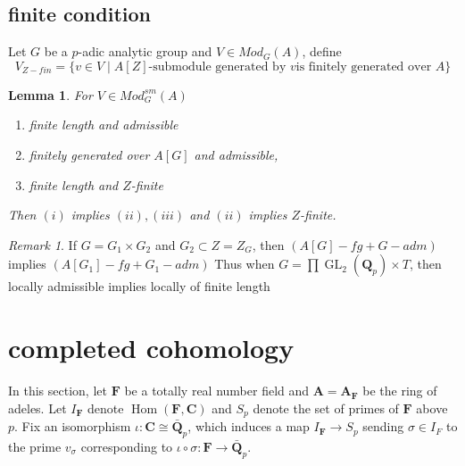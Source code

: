 \documentclass[leqno]{amsart}
\DeclareMathOperator{\GL}{GL}
\newcommand{\Q}{{\mathbf{Q}}}
\newcommand{\Qp}{\mathbf{Q}_p}
\newcommand{\C}{\mathbf C}
\newcommand{\A}{\mathbf A}
\newcommand{\F}{{\mathbf{F}}} %
\newcommand{\1}{\mathbf{1}}
\DeclareMathOperator{\Hom}{Hom}
\newtheorem{lem}[thm]{Lemma}
\theoremstyle{definition}
\theoremstyle{remark}
\newtheorem{rem}[thm]{Remark}
\begin{document}
\subsection{finite condition}

Let $G$ be a  $p$-adic analytic group
and  $V\in Mod_G(A)$, define 
 \[
	V_{Z-fin}=
	\{v\in V\mid \text{$A[Z]$-submodule generated by  $v$
	is finitely generated over  $A$}\}
\]
\begin{lem}
	For $V\in Mod_G^{sm}(A)$
	\begin{enumerate}[label=(\alph*)]
		\item finite length and admissible
		\item finitely generated over $A[G]$
			and admissible, 
		\item finite length and $Z$-finite
	\end{enumerate}
	Then $(i)$ implies $(ii), (iii)$
	and $(ii)$ implies  $Z$-finite.
\end{lem}

\begin{rem}
	If $G=G_1\times G_2$ and  $G_2\subset Z=Z_G$,
	then  $(A[G]-fg + G-adm)$ 
	implies  $(A[G_1]-fg + G_1-adm)$ 
	Thus when
	$G=\prod\GL_2(\Qp)\times T$,
	then locally admissible 
	implies locally of finite length
\end{rem}

\section{completed cohomology}

In this section, 
let $\F$ be a totally real number field
and  $\A=\A_\F$ be the ring of adeles.
Let $I_\F$ denote $\Hom(\F,\C)$
and $S_p$ denote the set of primes of $\F$ above $p$.
Fix an isomorphism $\iota\colon \C\cong \bar{\Q}_p$,
which induces a map $I_\F\to S_p$
sending  $\sigma\in I_F$
to the prime  $v_\sigma$
corresponding to $\iota\circ \sigma\colon \F\to \bar{\Q}_p$.
\end{document}

